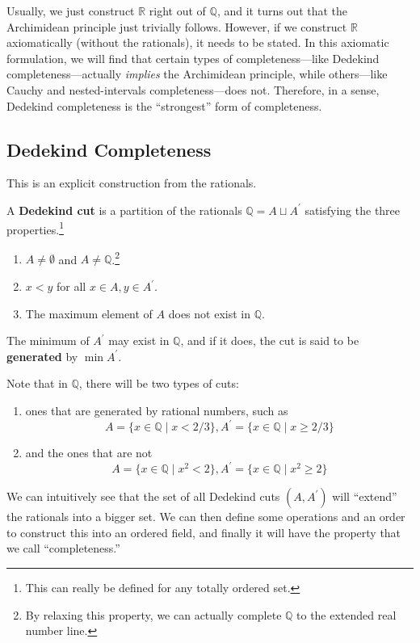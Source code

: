   Usually, we just construct $\mathbb{R}$ right out of $\mathbb{Q}$, and it turns out that the Archimidean principle just trivially follows. However, if we construct $\mathbb{R}$ axiomatically (without the rationals), it needs to be stated. In this axiomatic formulation, we will find that certain types of completeness---like Dedekind completeness---actually \textit{implies} the Archimidean principle, while others---like Cauchy and nested-intervals completeness---does not. Therefore, in a sense, Dedekind completeness is the ``strongest'' form of completeness. 

\subsection{Dedekind Completeness}  

  This is an explicit construction from the rationals. 

  \begin{definition} 
    A \textbf{Dedekind cut} is a partition of the rationals $\mathbb{Q} = A \sqcup A^\prime$ satisfying the three properties.\footnote{This can really be defined for any totally ordered set. } 
    \begin{enumerate}
      \item $A \neq \emptyset$ and $A \neq \mathbb{Q}$.\footnote{By relaxing this property, we can actually complete $\mathbb{Q}$ to the extended real number line. }
      \item $x < y$ for all $x \in A, y \in A^\prime$. 
      \item The maximum element of $A$ does not exist in $\mathbb{Q}$. 
    \end{enumerate}
    The minimum of $A^\prime$ may exist in $\mathbb{Q}$, and if it does, the cut is said to be \textbf{generated} by $\min A^\prime$. 
  \end{definition}

  Note that in $\mathbb{Q}$, there will be two types of cuts: 
  \begin{enumerate}
    \item ones that are generated by rational numbers, such as 
    \begin{equation}
      A = \{x \in \mathbb{Q} \mid x < 2/3 \}, A^\prime = \{ x \in \mathbb{Q} \mid x \geq 2/3 \} 
    \end{equation}
    \item and the ones that are not 
    \begin{equation}
      A = \{x \in \mathbb{Q} \mid x^2 < 2 \}, A^\prime = \{x \in \mathbb{Q} \mid x^2 \geq 2 \}
    \end{equation}
  \end{enumerate}
  We can intuitively see that the set of all Dedekind cuts $(A, A^\prime)$ will ``extend'' the rationals into a bigger set. We can then define some operations and an order to construct this into an ordered field, and finally it will have the property that we call ``completeness.''

